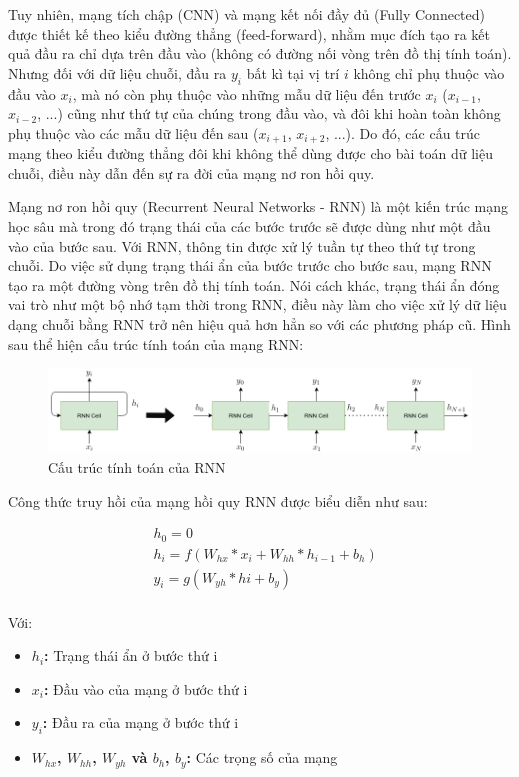 Tuy nhiên, mạng tích chập (CNN) và mạng kết nối đầy đủ (Fully Connected) được thiết kế theo kiểu đường thẳng (feed-forward), nhằm mục đích tạo ra kết quả đầu ra chỉ dựa trên đầu vào (không có đường nối vòng trên đồ thị tính toán). Nhưng đối với dữ liệu chuỗi, đầu ra $y_i$ bất kì tại vị trí $i$ không chỉ phụ thuộc vào đầu vào $x_i$, mà nó còn phụ thuộc vào những mẫu dữ liệu đến trước $x_i$ ($x_{i-1}$, $x_{i-2}$, ...) cũng như thứ tự của chúng trong đầu vào, và đôi khi hoàn toàn không phụ thuộc vào các mẫu dữ liệu đến sau ($x_{i+1}$, $x_{i+2}$, ...). Do đó, các cấu trúc mạng theo kiểu đường thẳng đôi khi không thể dùng được cho bài toán dữ liệu chuỗi, điều này dẫn đến sự ra đời của mạng nơ ron hồi quy.

Mạng nơ ron hồi quy (Recurrent Neural Networks - RNN) là một kiến trúc mạng học sâu mà trong đó trạng thái của các bước trước sẽ được dùng như một đầu vào của bước sau. Với RNN, thông tin được xử lý tuần tự theo thứ tự trong chuỗi. Do việc sử dụng trạng thái ẩn của bước trước cho bước sau, mạng RNN tạo ra một đường vòng trên đồ thị tính toán. Nói cách khác, trạng thái ẩn đóng vai trò như một bộ nhớ tạm thời trong RNN, điều này làm cho việc xử lý dữ liệu dạng chuỗi bằng RNN trở nên hiệu quả hơn hẳn so với các phương pháp cũ. Hình sau thể hiện cấu trúc tính toán của mạng RNN:

\begin{figure}[H]
    \centering
    \includegraphics[width=15cm]{./content/materials/rnns.png}
    \caption{Cấu trúc tính toán của RNN}
\end{figure}

Công thức truy hồi của mạng hồi quy RNN được biểu diễn như sau:

\begin{equation}
\begin{split}
    &h_0=0\\
    &h_i=f(W_{hx}*x_i+W_{hh}*h_{i-1}+b_h)\\
    &y_i=g(W_{yh}*hi+b_y)\\
\end{split}
\end{equation}

Với:
\begin{itemize}
    \item \textbf{$h_i$:} Trạng thái ẩn ở bước thứ i
    \item \textbf{$x_i$:} Đầu vào của mạng ở bước thứ i
    \item \textbf{$y_i$:} Đầu ra của mạng ở bước thứ i
    \item \textbf{$W_{hx}$, $W_{hh}$, $W_{yh}$ và $b_h$, $b_y$:} Các trọng số của mạng 
\end{itemize}

